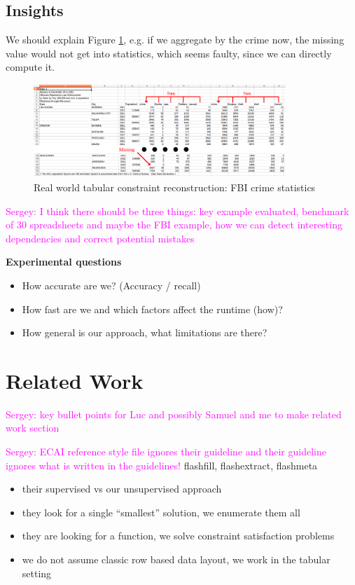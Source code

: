 \documentclass{ecai}
\newcommand{\sergey}[1]{\textcolor{magenta}{{\sc Sergey:} #1}\xspace}
\begin{document}
\subsection{Insights}
We should explain Figure \ref{fig:fbi}, e.g. if we aggregate by the crime now, the missing value would not get into statistics, which seems faulty, since we can directly compute it.

\begin{figure}[thb]
  \begin{center}
    \includegraphics[width=0.85\textwidth]{figures/fbi_figure_highlighted.png}
  \end{center}
  \caption{Real world tabular constraint reconstruction: FBI crime statistics}
  \label{fig:fbi}
\end{figure}


\sergey{I think there should be three things: key example evaluated, benchmark of 30 spreadsheets and maybe the FBI example, how we can detect interesting dependencies and correct potential mistakes}


{\bfseries 
  Experimental questions
}

\begin{itemize}
  \item  How accurate are we? (Accuracy / recall)
  \item  How fast are we and which factors affect the runtime (how)?
  \item  How general is our approach, what limitations are there?
\end{itemize}


\section{Related Work}
\sergey{key bullet points for Luc and possibly Samuel and me to make related work section}

\sergey{ECAI reference style file ignores their guideline and their guideline ignores what is written in the guidelines!}
flashfill, flashextract, flashmeta \cite{flashfill,flashextract,flashmeta}
\begin{itemize}
  \item their supervised vs our unsupervised approach
  \item they look for a single ``smallest'' solution, we enumerate them all
  \item they are looking for a function, we solve constraint satisfaction problems
  \item we do not assume classic row based data layout, we work in the tabular setting
\end{itemize}
\end{document}
